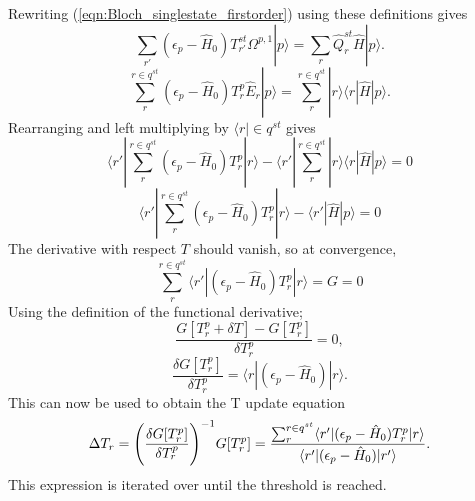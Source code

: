 \documentclass[12pt]{article}
\begin{document}
\noindent Rewriting (\ref{eqn:Bloch_singlestate_firstorder}) using these definitions gives
\begin{equation}
\sum_{r'}(\epsilon_{p} - \hat{H}_{0} )T_{r'}^{st} \Omega^{p,1}|p\rangle = \sum_{r}\hat{Q}^{st}_{r}\hat{H}|p\rangle .
\label{eqn:Bloch_singlestate_firstorder_st}
\end{equation}
\begin{equation*}
\sum_{r}^{r\in q^{st}} (\epsilon_{p} - \hat{H}_{0} )T_{r}^{p} \hat{E}_{r} | p \rangle 
= 
\sum_{r}^{r\in q^{st}} |r \rangle \langle r | \hat{H}|p\rangle .
\end{equation*}
Rearranging and left multiplying by $\langle r | \in q^{st}$ gives  
\begin{equation*}
\langle r' | \sum_{r}^{r\in q^{st}} (\epsilon_{p} - \hat{H}_{0} )T_{r}^{p} | r \rangle 
-
\langle r' | \sum_{r}^{r\in q^{st}} | r \rangle \langle r | \hat{H} |p\rangle = 0
\end{equation*}
\begin{equation}
\langle r' | \sum_{r}^{r\in q^{st}} (\epsilon_{p} - \hat{H}_{0} )T_{r}^{p} | r \rangle 
-
\langle r' | \hat{H} |p\rangle = 0
\label{eqn:Amplitude_eqn}
\end{equation}
The derivative with respect $T$ should vanish, so at convergence,
\begin{equation}
\sum_{r}^{r\in q^{st}} \langle r' |(\epsilon_{p} - \hat{H}_{0} )T_{r}^{p} | r \rangle = G = 0 
\label{eqn:caspt2_residual}
\end{equation}
Using the definition of the functional derivative;
\begin{equation*}
\frac{G[T_{r}^{p} + \delta T ] - G[T_{r}^{p}]}{ \delta T_{r}^{p} } = 0,
\end{equation*}
\begin{equation}
\frac{\delta G[T^{p}_{r}]} { \delta T^{p}_{r}}  = 
\langle r |(\epsilon_{p} - \hat{H}_{0} )| r \rangle.
\end{equation}
This can now be used to obtain the T update equation
\begin{equation}
\Delta T_{r} = \Bigg{(}\frac{\delta G[T^{p}_{r}]} { \delta T^{p}_{r}}\Bigg{)}^{-1}G[T^{p}_{r}]  = 
\frac{\sum_{r}^{r\in q^{st}} \langle r' |(\epsilon_{p} - \hat{H}_{0} )T_{r}^{p} | r \rangle} 
{\langle r' |(\epsilon_{p} - \hat{H}_{0} )| r' \rangle}.
\label{eqn:T_update}
\end{equation}
This expression is iterated over until the threshold is reached. 
\end{document}
